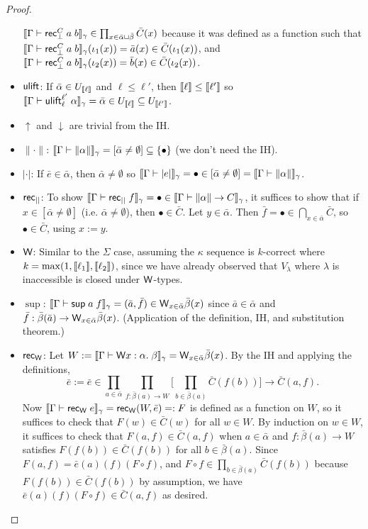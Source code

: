 \begin{proof}
\begin{itemize}
$\scott{\Gamma\vdash\rec^C_\bot\;a\;b}_\gamma\in\prod_{x\in\bar\alpha\sqcup\bar\beta}\bar C(x)$ because it was defined as a function such that $\scott{\Gamma\vdash\rec^C_\bot\;a\;b}_\gamma(\iota_1(x))=\bar a(x)\in\bar C(\iota_1(x))$, and $\scott{\Gamma\vdash\rec^C_\bot\;a\;b}_\gamma(\iota_2(x))=\bar b(x)\in\bar C(\iota_2(x))$.
\item $\mathsf{ulift}$: If $\bar\alpha\in U_{\llbracket \ell\rrbracket}$ and $\ell\le\ell'$, then $\llbracket \ell\rrbracket\le\llbracket \ell'\rrbracket$ so $\scott{\Gamma\vdash\ulift_{\ell}^{\ell'}\;\alpha}_\gamma=\bar\alpha\in U_{\scott{\ell}}\subseteq U_{\scott{\ell'}}$.
\item $\uparrow$ and $\downarrow$ are trivial from the IH.
\item $\|\cdot\|$: $\scott{\Gamma\vdash\|\alpha\|}_\gamma=[\bar\alpha\ne\emptyset]\subseteq\{\bullet\}$ (we don't need the IH).
\item $|\cdot|$: If $\bar e\in\bar\alpha$, then $\bar\alpha\ne\emptyset$ so $\scott{\Gamma\vdash|e|}_\gamma=\bullet\in[\bar\alpha\ne\emptyset]=\scott{\Gamma\vdash\|\alpha\|}_\gamma$.
\item $\mathsf{rec}_{||}$: To show $\scott{\Gamma\vdash\rec_{||}\;f}_\gamma=\bullet\in\scott{\Gamma\vdash\|\alpha\|\to C}_\gamma$, it suffices to show that if $x\in[\bar\alpha\ne\emptyset]$ (i.e. $\bar\alpha\ne\emptyset$), then $\bullet\in\bar C$. Let $y\in\bar\alpha$. Then $\bar f=\bullet\in\bigcap_{x\in\bar\alpha}\bar C$, so $\bullet\in\bar C$, using $x:=y$.
\item $\mathsf{W}$: Similar to the $\Sigma$ case, assuming the $\kappa$ sequence is $k$-correct where $k=\max(1,\llbracket \ell_1\rrbracket,\llbracket \ell_2\rrbracket)$, since we have already observed that $V_\lambda$ where $\lambda$ is inaccessible is closed under $\mathsf{W}$-types.
\item $\sup$: $\scott{\Gamma\vdash \sup a\;f}_\gamma=(\bar a,\bar f)\in\W_{x\in\bar\alpha}\bar\beta(x)$ since $\bar a\in\bar\alpha$ and $\bar f:\bar\beta(\bar a)\to\mathsf{W}_{x\in\bar\alpha}\bar\beta(x)$. (Application of the definition, IH, and substitution theorem.)
\item $\mathsf{rec}_{\mathsf{W}}$: Let $W:=\scott{\Gamma\vdash\W x:\alpha.\;\beta}_\gamma=\W_{x\in\bar\alpha}\bar\beta(x)$. By the IH and applying the definitions, $$\bar e:=\bar e\in\prod_{a\in\bar\alpha}\prod_{f:\bar\beta(a)\to W}\Big[\prod_{b\in\bar\beta(a)}\bar C(f(b))\Big]\to \bar C(a,f).$$
Now $\scott{\Gamma\vdash \rec_\W\;e}_\gamma=\rec_\W(W,\bar e)=:F$ is defined as a function on $W$, so it suffices to check that $F(w)\in\bar C(w)$ for all $w\in W$. By induction on $w\in W$, it suffices to check that $F(a,f)\in\bar C(a,f)$ when $a\in\bar\alpha$ and $f:\bar\beta(a)\to W$ satisfies $F(f(b))\in\bar C(f(b))$ for all $b\in\bar\beta(a)$. Since $F(a,f)=\bar e(a)(f)(F\circ f)$, and $F\circ f\in \prod_{b\in\bar\beta(a)}\bar C(f(b))$ because $F(f(b))\in\bar C(f(b))$ by assumption, we have $\bar e(a)(f)(F\circ f)\in\bar C(a,f)$ as desired.

\end{itemize}
\end{proof}
